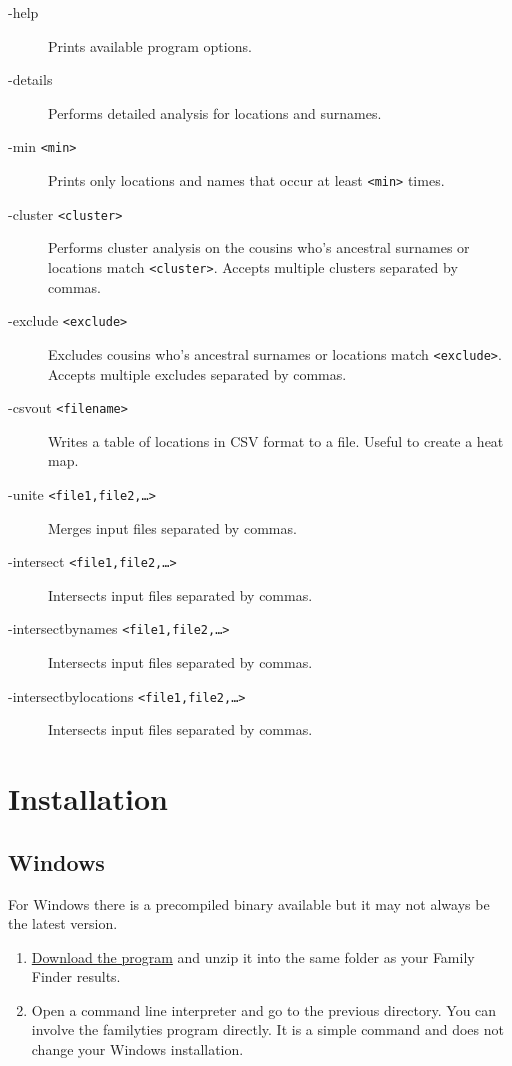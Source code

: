 \documentclass[12pt,a4paper]{article}
\begin{document}
\begin{description}
\item[-help] Prints available program options.
\item[-details] Performs detailed analysis for locations
  and surnames.
\item[-min \texttt{<min>}] Prints only locations and names that occur at
  least \texttt{<min>} times.
\item[-cluster \texttt{<cluster>}] Performs cluster analysis on the cousins
  who's ancestral surnames or locations match \texttt{<cluster>}.
  Accepts multiple clusters separated by commas.
\item[-exclude \texttt{<exclude>}] Excludes cousins who's ancestral surnames or
  locations match \texttt{<exclude>}.
  Accepts multiple excludes separated by commas.
\item[-csvout \texttt{<filename>}] Writes a table of locations in CSV format
  to a file. Useful to create a heat map.
\item[-unite \texttt{<file1,file2,\dots>}]
  Merges input files separated by commas.
\item[-intersect \texttt{<file1,file2,\dots>}]
  Intersects input files separated by commas.
\item[-intersectbynames \texttt{<file1,file2,\dots>}]
  Intersects input files separated by commas.
\item[-intersectbylocations \texttt{<file1,file2,\dots>}]
  Intersects input files separated by commas.
\end{description}


\section{Installation}

\subsection{Windows}
For Windows there is a precompiled binary available but it
may not always be the latest version.
\begin{enumerate}
\item \href{http://www.projectory.de/genetics/familyties.zip}
  {Download the program} and unzip it into the same folder
  as your Family Finder results.
\item Open a command line interpreter and go to the previous
  directory. You can involve the familyties program directly.
  It is a simple command and does not change your Windows
  installation.
\end{enumerate}
\end{document}
